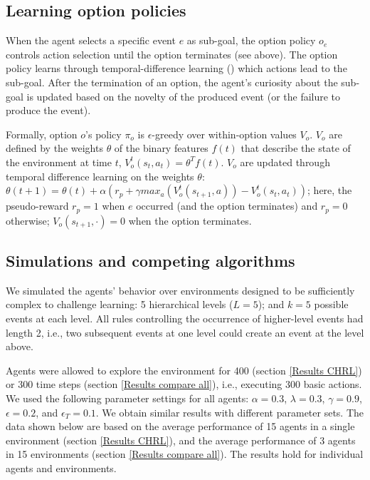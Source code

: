 \documentclass{article}
\begin{document}
\subsection{Learning option policies}

When the agent selects a specific event $e$ as sub-goal, the option policy $o_e$ controls action selection until the option terminates (see above). The option policy learns through temporal-difference learning (\cite{sutton_reinforcement_2017}) which actions lead to the sub-goal. After the termination of an option, the agent's curiosity about the sub-goal is updated based on the novelty of the produced event (or the failure to produce the event).

Formally, option $o$'s policy $\pi_o$ is $\epsilon$-greedy over within-option values $V_o$. $V_o$ are defined by the weights $\theta$ of the binary features $f(t)$ that describe the state of the environment at time $t$, $V_o^{t}(s_t, a_t) = \theta^T f(t)$. 
$V_o$ are updated through temporal difference learning on the weights $\theta$: $\theta(t+1) = \theta(t) + \alpha (r_p + \gamma max_a(V_o^{t}(s_{t+1}, a)) - V_o^{t}(s_t, a_t))$; here, the pseudo-reward $r_p = 1$ when $e$ occurred (and the option terminates) and $r_p = 0$ otherwise; $V_o(s_{t+1},\cdot) = 0$ when the option terminates. 

\subsection{Simulations and competing algorithms} \label{Comparison agents}

We simulated the agents' behavior over environments designed to be sufficiently complex to challenge learning: 5 hierarchical levels ($L = 5$); and $k = 5$ possible events at each level. All rules controlling the occurrence of higher-level events had length 2, i.e., two subsequent events at one level could create an event at the level above.%

Agents were allowed to explore the environment for 400 (section \ref{Results CHRL}) or 300 time steps (section \ref{Results compare all}), i.e., executing 300 basic actions. We used the following parameter settings for all agents: $\alpha = 0.3$, $\lambda = 0.3$, $\gamma = 0.9$, $\epsilon = 0.2$, and $\epsilon_T = 0.1$. We obtain similar results with different parameter sets. The data shown below are based on the average performance of 15 agents in a single environment (section \ref{Results CHRL}), and the average performance of 3 agents in 15 environments (section \ref{Results compare all}). The results hold for individual agents and environments.
\end{document}

